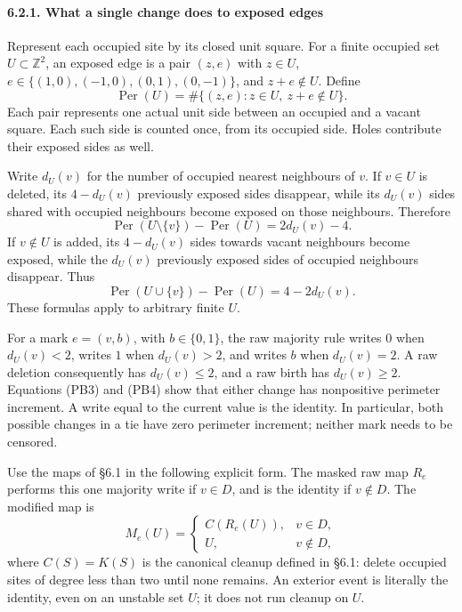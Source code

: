 \documentclass[
  11pt,
  a4paper,
]{article}
\begin{document}
\paragraph{6.2.1. What a single change does to exposed
edges}\label{what-a-single-change-does-to-exposed-edges}

Represent each occupied site by its closed unit square. For a finite
occupied set \(U\subset\mathbb Z^2\), an exposed edge is a pair
\((z,e)\) with \(z\in U\), \(e\in\{(1,0),(-1,0),(0,1),(0,-1)\}\), and
\(z+e\notin U\). Define \[
\operatorname{Per}(U)
=\#\{(z,e):z\in U,\ z+e\notin U\}.
\tag{PB2}
\] Each pair represents one actual unit side between an occupied and a
vacant square. Each such side is counted once, from its occupied side.
Holes contribute their exposed sides as well.

Write \(d_U(v)\) for the number of occupied nearest neighbours of \(v\).
If \(v\in U\) is deleted, its \(4-d_U(v)\) previously exposed sides
disappear, while its \(d_U(v)\) sides shared with occupied neighbours
become exposed on those neighbours. Therefore \[
\operatorname{Per}(U\setminus\{v\})-\operatorname{Per}(U)
=2d_U(v)-4.
\tag{PB3}
\] If \(v\notin U\) is added, its \(4-d_U(v)\) sides towards vacant
neighbours become exposed, while the \(d_U(v)\) previously exposed sides
of occupied neighbours disappear. Thus \[
\operatorname{Per}(U\cup\{v\})-\operatorname{Per}(U)
=4-2d_U(v).
\tag{PB4}
\] These formulas apply to arbitrary finite \(U\).

For a mark \(e=(v,b)\), with \(b\in\{0,1\}\), the raw majority rule
writes \(0\) when \(d_U(v)<2\), writes \(1\) when \(d_U(v)>2\), and
writes \(b\) when \(d_U(v)=2\). A raw deletion consequently has
\(d_U(v)\leq2\), and a raw birth has \(d_U(v)\geq2\). Equations (PB3)
and (PB4) show that either change has nonpositive perimeter increment. A
write equal to the current value is the identity. In particular, both
possible changes in a tie have zero perimeter increment; neither mark
needs to be censored.

Use the maps of §6.1 in the following explicit form. The masked raw map
\(R_e\) performs this one majority write if \(v\in D\), and is the
identity if \(v\notin D\). The modified map is \[
M_e(U)=
\begin{cases}
C(R_e(U)),&v\in D,\\
U,&v\notin D,
\end{cases}
\tag{PB5}
\] where \(C(S)=K(S)\) is the canonical cleanup defined in §6.1: delete
occupied sites of degree less than two until none remains. An exterior
event is literally the identity, even on an unstable set \(U\); it does
not run cleanup on \(U\).
\end{document}
